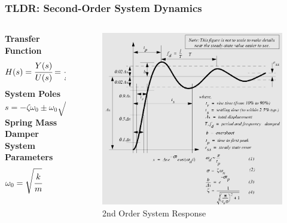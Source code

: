 \documentclass[aspectratio=169,handout]{beamer}
\begin{document}
\begin{frame}
	\frametitle{TLDR: Second-Order System Dynamics}
	\begin{columns}
		\begin{column}{0.5\textwidth}
			\textbf{Transfer Function}
			\[
				H(s) 
				= \cfrac{Y(s)}{U(s)} 
				= \cfrac{
					\omega_0^2
				}{
					s^2 + 2 \zeta \omega_0 s + \omega_0^2
				}
			\]
			\textbf{System Poles}
			\[
				s = - \zeta \omega_0 \pm \omega_0 \sqrt{1 - \zeta^2}
			\]
			\textbf{Spring Mass Damper System Parameters}
			\[
				\omega_0 = \sqrt{\cfrac{k}{m}}
				\hspace{0.5 in}
				\zeta = \sqrt{\cfrac{c^2}{4 m k}}
			\]
		\end{column}
		\begin{column}{0.375\textwidth}
			\begin{figure}[]
				\includegraphics[width=\textwidth]{Images/2ndOrderTransient.png}
				2nd Order System Response \cite{engineerOnADisk_2ndOrderDynamics}
			\end{figure}
		\end{column}
	\end{columns}
\end{frame}
\end{document}
